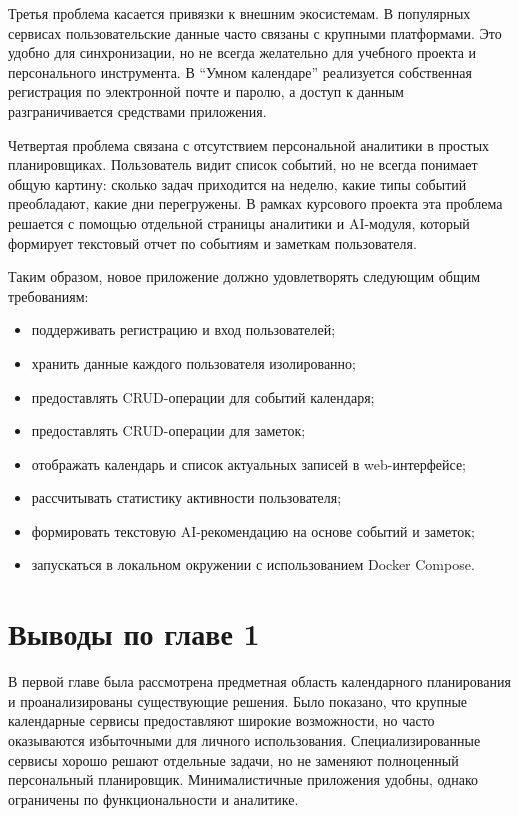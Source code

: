 \documentclass[14pt,a4paper]{extreport}
\begin{document}
Третья проблема касается привязки к внешним экосистемам. В популярных сервисах пользовательские данные часто связаны с крупными платформами. Это удобно для синхронизации, но не всегда желательно для учебного проекта и персонального инструмента. В ``Умном календаре'' реализуется собственная регистрация по электронной почте и паролю, а доступ к данным разграничивается средствами приложения.

Четвертая проблема связана с отсутствием персональной аналитики в простых планировщиках. Пользователь видит список событий, но не всегда понимает общую картину: сколько задач приходится на неделю, какие типы событий преобладают, какие дни перегружены. В рамках курсового проекта эта проблема решается с помощью отдельной страницы аналитики и AI-модуля, который формирует текстовый отчет по событиям и заметкам пользователя.

Таким образом, новое приложение должно удовлетворять следующим общим требованиям:
\begin{itemize}
    \item поддерживать регистрацию и вход пользователей;
    \item хранить данные каждого пользователя изолированно;
    \item предоставлять CRUD-операции для событий календаря;
    \item предоставлять CRUD-операции для заметок;
    \item отображать календарь и список актуальных записей в web-интерфейсе;
    \item рассчитывать статистику активности пользователя;
    \item формировать текстовую AI-рекомендацию на основе событий и заметок;
    \item запускаться в локальном окружении с использованием Docker Compose.
\end{itemize}

\section{Выводы по главе 1}

В первой главе была рассмотрена предметная область календарного планирования и проанализированы существующие решения. Было показано, что крупные календарные сервисы предоставляют широкие возможности, но часто оказываются избыточными для личного использования. Специализированные сервисы хорошо решают отдельные задачи, но не заменяют полноценный персональный планировщик. Минималистичные приложения удобны, однако ограничены по функциональности и аналитике.
\end{document}
